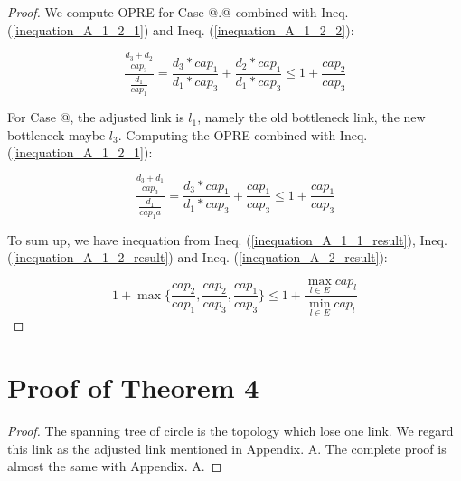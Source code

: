 \documentclass[conference]{IEEEtran}
\makeatletter
\newcommand{\Rmnum}[1]{\expandafter\@slowromancap\romannumeral #1@}
\makeatother
\begin{document}
\begin{proof}
We compute OPRE for Case \Rmnum{1}.\Rmnum{2} combined with Ineq. (\ref{inequation_A_1_2_1}) and Ineq. (\ref{inequation_A_1_2_2}):

\begin{equation}
\label{inequation_A_1_2_result}
\frac {\frac{d_3 + d_2}{cap_3}} {\frac{d_1}{cap_1}} =
\frac {d_3 * cap_1}{d_1 * cap_3} + \frac {d_2 * cap_1}{d_1 * cap_3} \leq 1 + \frac{cap_2}{cap_3}
\end{equation}


For Case \Rmnum{2}, the adjusted link is $l_1$, namely the old bottleneck link, the new bottleneck
maybe $l_3$. Computing the OPRE combined with Ineq. (\ref{inequation_A_1_2_1}):

\begin{equation}
\label{inequation_A_2_result}
\frac {\frac{d_3 + d_1}{cap_3}} {\frac{d_1}{cap_1a}} =
\frac {d_3 * cap_1}{d_1 * cap_3} + \frac{cap_1}{cap_3} \leq 1 + \frac{cap_1}{cap_3}
\end{equation}


To sum up, we have inequation from Ineq. (\ref{inequation_A_1_1_result}), Ineq. (\ref{inequation_A_1_2_result}) and Ineq. (\ref{inequation_A_2_result}):

\begin{equation}
\label{inequation_A_result}
1 + \max \{\frac{cap_2}{cap_1}, \frac{cap_2}{cap_3}, \frac{cap_1}{cap_3} \} \leq 1 + \frac{\max_{l \in E} cap_{l}}{\min_{l \in E} cap_{l}}
\end{equation}

\end{proof}

\section{Proof of Theorem 4}
\begin{proof}
The spanning tree of circle is the topology which lose one link. 
We regard this link as the adjusted link mentioned in Appendix. A. The complete proof is almost the same with Appendix. A.
\end{proof}
\end{document}
